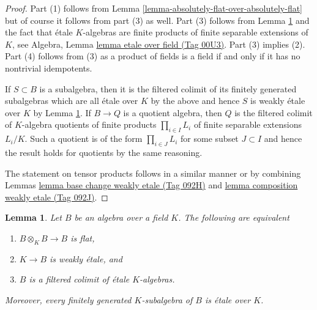 \documentclass{amsart}
\theoremstyle{plain}
\newtheorem{lemma}[subsection]{Lemma}
\theoremstyle{definition}
\theoremstyle{remark}
\numberwithin{equation}{subsection}
\begin{document}
\begin{proof}
Part (1) follows from Lemma \ref{lemma-absolutely-flat-over-absolutely-flat}
but of course it follows from part (3) as well.
Part (3) follows from Lemma \ref{lemma-absolutely-flat-over-field}
and the fact that \'etale $K$-algebras are finite products of
finite separable extensions of $K$, see
Algebra, Lemma \href{https://stacks.math.columbia.edu/tag/00U3}{lemma etale over field (Tag 00U3)}.
Part (3) implies (2).
Part (4) follows from (3) as a product of fields is
a field if and only if it has no nontrivial idempotents.

\medskip\noindent
If $S \subset B$ is a subalgebra, then it is the filtered
colimit of its finitely generated subalgebras which are
all \'etale over $K$ by the above and hence
$S$ is weakly \'etale over $K$ by
Lemma \ref{lemma-absolutely-flat-over-field}.
If $B \to Q$ is a quotient algebra, then
$Q$ is the filtered colimit of $K$-algebra quotients of
finite products $\prod_{i \in I} L_i$ of finite separable extensions
$L_i/K$. Such a quotient is of the form $\prod_{i \in J} L_i$
for some subset $J \subset I$ and hence the result
holds for quotients by the same reasoning.

\medskip\noindent
The statement on tensor products follows in a similar manner
or by combining Lemmas \href{https://stacks.math.columbia.edu/tag/092H}{lemma base change weakly etale (Tag 092H)} and
\href{https://stacks.math.columbia.edu/tag/092J}{lemma composition weakly etale (Tag 092J)}.
\end{proof}


\begin{lemma}
\label{lemma-absolutely-flat-over-field}
Let $B$ be an algebra over a field $K$. The following are
equivalent
\begin{enumerate}
\item $B \otimes_K B \to B$ is flat,
\item $K \to B$ is weakly \'etale, and
\item $B$ is a filtered colimit of \'etale $K$-algebras.
\end{enumerate}
Moreover, every finitely generated $K$-subalgebra of $B$
is \'etale over $K$.
\end{lemma}
\end{document}
